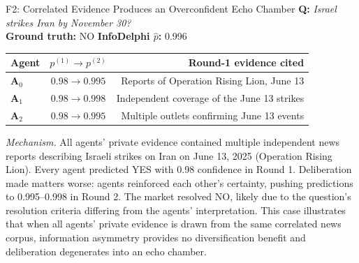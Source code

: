 \documentclass[11pt]{article}
\theoremstyle{plain}
\theoremstyle{definition}
\newcommand{\agA}[1]{\textcolor{agA}{\textbf{#1}}}
\newcommand{\agB}[1]{\textcolor{agB}{\textbf{#1}}}
\newcommand{\agC}[1]{\textcolor{agC}{\textbf{#1}}}
\begin{document}
\begin{failurecase}{F2: Correlated Evidence Produces an Overconfident Echo Chamber}
\textbf{Q:} \textit{Israel strikes Iran by November 30?}\\[2pt]
\textbf{Ground truth:} NO \quad \textbf{InfoDelphi $\hat{p}$:} 0.996

\smallskip
\setlength{\tabcolsep}{4pt}
\renewcommand{\arraystretch}{1.2}
\begin{tabularx}{\linewidth}{@{}l c R@{}}
\toprule
\textbf{Agent} & $p^{(1)}\!\to\!p^{(2)}$ & \textbf{Round-1 evidence cited} \\
\midrule
\agA{A$_0$} & $0.98 \to 0.995$ & Reports of Operation Rising Lion, June 13 \\
\agB{A$_1$} & $0.98 \to 0.998$ & Independent coverage of the June 13 strikes \\
\agC{A$_2$} & $0.98 \to 0.995$ & Multiple outlets confirming June 13 events \\
\bottomrule
\end{tabularx}

\smallskip
\textit{Mechanism.} All agents' private evidence contained multiple
independent news reports describing Israeli strikes on Iran on June 13, 2025
(Operation Rising Lion). Every agent predicted YES with 0.98 confidence in
Round 1. Deliberation made matters worse: agents reinforced each other's
certainty, pushing predictions to 0.995--0.998 in Round 2. The market
resolved NO, likely due to the question's resolution criteria differing from
the agents' interpretation. This case illustrates that when all agents'
private evidence is drawn from the same correlated news corpus, information
asymmetry provides no diversification benefit and deliberation degenerates
into an echo chamber.
\end{failurecase}
\end{document}
